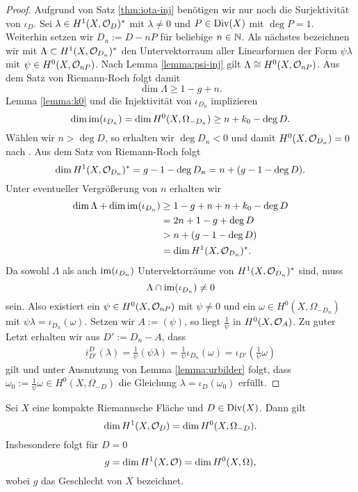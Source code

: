 \begin{proof}
  Aufgrund von Satz \ref{thm:iota-inj} benötigen wir nur noch die
  Surjektivität von $\iota_D$. Sei \break$\lambda \in H^1(X, \mathcal{O}_D)^\ast$
  mit $\lambda \neq 0$ und $P \in \operatorname{Div}(X)$ mit $\deg P = 1$. Weiterhin
  setzen wir $D_n := D - n P$ für beliebige $n \in \mathbb{N}$. Als nächstes
  bezeichnen wir mit $\Lambda \subset H^1(X, \mathcal{O}_{D_n})^\ast$ den
  Untervektorraum aller Linearformen der Form $\psi \lambda$ mit
  $\psi \in H^0(X, \mathcal{O}_{nP})$. Nach Lemma \ref{lemma:psi-inj} gilt
  $\Lambda \cong H^0(X, \mathcal{O}_{nP})$. Aus dem Satz von Riemann-Roch
  folgt damit
  \[
  \dim \Lambda \geq 1 - g + n.
  \]
  Lemma \ref{lemma:k0} und die Injektivität von $\iota_{D_n}$ implizieren
  \[
  \dim \operatorname{im}(\iota_{D_n}) = \dim H^0(X, \Omega_{-D_n}) \geq n + k_0 -
  \deg D.
  \]
  Wählen wir $n > \deg D$, so erhalten wir $\deg D_n < 0$ und damit
  $H^0(X, \mathcal{O}_{D_n}) = 0$ nach \cite[Satz 16.5]{For}. Aus dem Satz von Riemann-Roch folgt
  \[
  \dim H^1(X, \mathcal{O}_{D_n})^\ast = g - 1 - \deg D_n = n + ( g - 1 -
  \deg D).
  \]
  Unter eventueller Vergrößerung von $n$ erhalten wir
  \begin{align*}
    \dim \Lambda + \dim \operatorname{im}(\iota_{D_n}) & \geq 1 - g + n + n + k_0 -
    \deg D \\
    & = 2 n + 1 - g + \deg D \\
    & > n + (g - 1 - \deg D) \\
    & = \dim H^1(X, \mathcal{O}_{D_n})^\ast.
  \end{align*}
  Da sowohl $\Lambda$ als auch $\operatorname{im}(\iota_{D_n})$ Untervektorräume von
  $H^1(X, \mathcal{O}_{D_n})^\ast$ sind, muss
  \[
  \Lambda \cap \operatorname{im}(\iota_{D_n}) \neq 0
  \]
  sein. Also existiert ein $\psi \in H^0(X, \mathcal{O}_{nP})$ mit
  $\psi \neq 0$ und ein $\omega \in H^0(X, \Omega_{-D_n})$ mit $\psi
  \lambda = \iota_{D_n}(\omega)$. Setzen wir $A := (\psi)$, so liegt
  $\frac{1}{\psi}$ in $H^0(X, \mathcal{O}_A)$. Zu guter Letzt erhalten wir aus
  $D' := D_n - A$, dass
  \begin{align*}
    i_{D'}^D(\lambda) = \frac{1}{\psi} (\psi \lambda) =
    \frac{1}{\psi} \iota_{D_n}(\omega) = \iota_{D'} \left (
      \frac{1}{\psi} \omega \right )
  \end{align*}
  gilt und unter Ausnutzung von Lemma \ref{lemma:urbilder} folgt, dass
  $\omega_0 := \frac{1}{\psi} \omega \in H^0(X, \Omega_{-D})$ die
  Gleichung $\lambda = \iota_D(\omega_0)$ erfüllt.
\end{proof}

\begin{cor}
  \label{cor:dim-1-form}
  Sei $X$ eine kompakte Riemannsche Fläche und $D \in \operatorname{Div}(X)$. Dann
  gilt
  \[
  \dim H^1(X, \mathcal{O}_D) = \dim H^0(X, \Omega_{-D}).
  \]
  Insbesondere folgt für $D = 0$
  \[
  g = \dim H^1(X, \mathcal{O}) = \dim H^0(X, \Omega),
  \]
  wobei $g$ das Geschlecht von $X$ bezeichnet.
\end{cor}

